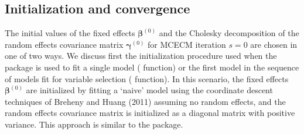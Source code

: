 


\subsection{Initialization and convergence}
\label{sec:initial}
The initial values of the fixed effects $\boldsymbol \beta^{(0)}$ and the Cholesky decomposition of the random effects covariance matrix $\boldsymbol \gamma^{(0)}$ for MCECM iteration $s=0$ are chosen in one of two ways. We discuss first the initialization procedure used when the package  is used to fit a single model ( function) or the first model in the sequence of models fit for variable selection ( function). In this scenario, the fixed effects $\boldsymbol \beta^{(0)}$ are initialized by fitting a `naive' model using the coordinate descent techniques of Breheny and Huang (2011) assuming no random effects, and the random effects covariance matrix is initialized as a diagonal matrix with positive variance. This approach is similar to the  package. 

